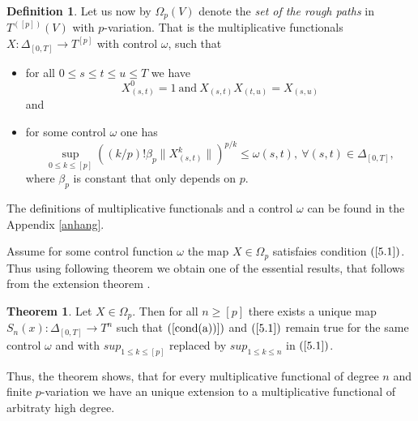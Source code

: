 \documentclass[12pt,a4paper]{report}
\theoremstyle{definition}
\newtheorem{theorem}{Theorem}
\newtheorem{definition}{Definition}
\begin{document}
\begin{definition}\parencite[see][]{chevyrev2016characteristic}
	Let us now by $\Omega_p (V)$ denote the \textit{set of the rough paths} in $T^{([p])}(V)$ with $p$-variation. That is the multiplicative functionals $X:\Delta_{[0,T]} \rightarrow T^{[p]} $ with control $\omega$, such that 
	
	\begin{itemize}
		
		\item  for all $0\leq s\leq t \leq u \leq T$ we have
		\begin{equation} \label{cond(a))}
			X_{(s,t)}^0=1 \: \text{and} \: X_{(s,t)}X_{(t,u)}=X_{(s,u)}
		\end{equation}
		and
		\item for some control $\omega$ one has
		\begin{equation} \label{5.1}
			\sup_{0\leq k \leq [p]} ((k/p)!\beta_p \lVert X_{(s,t)}^k \rVert)^{p/k}\leq \omega (s,t), \: \forall (s,t)\in \Delta_{[0,T]},
		\end{equation}
		where $\beta_p$ is constant that only depends on $p$.
	\end{itemize} 
\end{definition}
The definitions of multiplicative functionals and a control $\omega$ can be found in the Appendix \ref{anhang}. 


Assume for some control function $\omega$ the map $X\in \Omega_p$ satisfaies condition $(\ref{5.1})$. Thus using following theorem we obtain one of the essential results, that follows from the extension theorem \parencite[see][Theorem 3.7]{lyons2007differential}.

\begin{theorem}\parencite[see][Theorem 3.1.3]{chevyrev2015characteristic}
	Let $X \in \Omega_p$. Then for all $n \geq [p]$ there exists
	a unique map $S_n(x) : \Delta_{[0,T]} \rightarrow T^n$ such that $(\ref{cond(a))})$ and $(\ref{5.1})$ remain true for the same control $\omega$	and with $sup_{1\leq k\leq [p]}$	replaced by $sup_{1\leq k\leq n}$ in $(\ref{5.1})$.
\end{theorem}
 
 Thus, the theorem shows, that for every multiplicative functional of degree $n$ and finite $p$-variation we have an unique extension to a multiplicative functional of arbitraty high degree.
 
\end{document}

